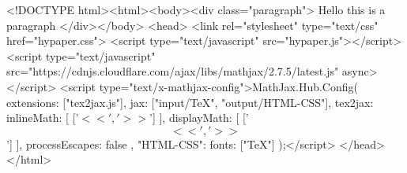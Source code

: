 <!DOCTYPE html><html><body><div class="paragraph"> Hello this is a paragraph </div></body>
<head>
    <link rel="stylesheet" type="text/css" href="hypaper.css">
    <script type="text/javascript" src="hypaper.js"></script>
    <script type="text/javascript" src="https://cdnjs.cloudflare.com/ajax/libs/mathjax/2.7.5/latest.js" async></script>
    <script type="text/x-mathjax-config">MathJax.Hub.Config({ extensions: ["tex2jax.js"], jax: ["input/TeX", "output/HTML-CSS"], tex2jax: { inlineMath: [ ['$<<','>>$'] ], displayMath: [ ['$$<<','>>$$'] ], processEscapes: false }, "HTML-CSS": { fonts: ["TeX"] } });</script>
</head>
</html>

